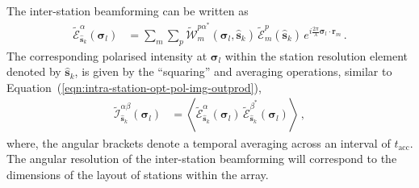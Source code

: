 \documentclass[
  journal=pasa,
  manuscript=article-type,
  year=2020,
  volume=37,
]{cup-journal}
\begin{document}
The inter-station beamforming 
can be written as
\begin{align}
    \widetilde{\mathcal{E}}_{\hat{\boldsymbol{s}}_k}^\alpha(\boldsymbol{\sigma}_l) &= \sum_{m} \sum_p  \widetilde{\mathcal{W}}_{m}^{{p\alpha}^*}(\boldsymbol{\sigma}_l,\hat{\boldsymbol{s}}_k) \, \widetilde{\mathcal{E}}_m^p(\hat{\boldsymbol{s}}_k) \, e^{i\frac{2\pi}{\lambda} \boldsymbol{\sigma}_l\cdot\boldsymbol{r}_{m}} \, . \label{eqn:inter-station-pol-hol-img-expl}    
\end{align}
The corresponding polarised intensity at $\boldsymbol{\sigma}_l$ within the station resolution element denoted by $\hat{\boldsymbol{s}}_k$, is given by the ``squaring'' and averaging operations, similar to Equation~(\ref{eqn:intra-station-opt-pol-img-outprod}),
\begin{align}
    \widetilde{\mathcal{I}}^{\alpha\beta}_{\hat{\boldsymbol{s}}_k}(\boldsymbol{\sigma}_l) &= \left\langle \widetilde{\mathcal{E}}_{\hat{\boldsymbol{s}}_k}^\alpha(\boldsymbol{\sigma}_l) \,  \widetilde{\mathcal{E}}_{\hat{\boldsymbol{s}}_k}^{\beta^*}(\boldsymbol{\sigma}_l) \right\rangle \, , \label{eqn:inter-station-opt-pol-img-outprod}
\end{align}
where, the angular brackets denote a temporal averaging across an interval of $t_\textrm{acc}$. The angular resolution of the inter-station beamforming will correspond to the dimensions of the layout of stations within the array.

\end{document}
